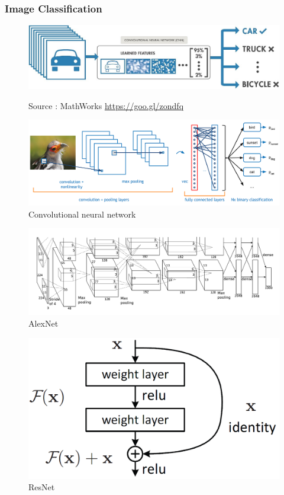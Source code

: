 \documentclass[presentation]{beamer}
\begin{document}
\begin{frame}[allowframebreaks]
    \frametitle{Image Classification}

    \begin{figure}
        \centering
        \includegraphics[width=0.95\linewidth]{1.jpeg}
        \caption{}
        Source : MathWorks \url{https://goo.gl/zondfq}
    \end{figure}

    \begin{figure}
        \centering
        \includegraphics[width=0.95\linewidth]{1_1.png}
        \caption{Convolutional neural network}
    \end{figure}

    \begin{figure}
        \centering
        \includegraphics[width=0.95\linewidth]{1_2.png}
        \caption{AlexNet}
    \end{figure}

    \begin{figure}
        \centering
        \includegraphics[width=0.8\linewidth]{1_3.png}
        \caption{ResNet}
    \end{figure}


\end{frame}
\end{document}
